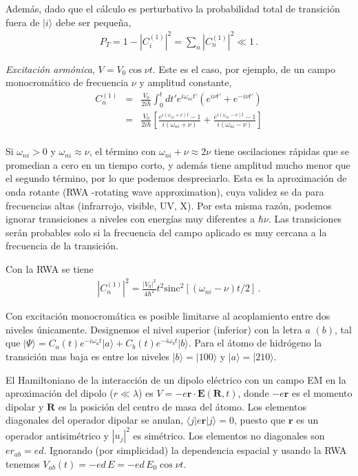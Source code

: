 \documentclass[twocolumn,aps,eqsecnum]{revtex4}
\newcommand{\mbr}{\mathbf{r}}
\newcommand{\mbE}{\mathbf{E}}
\newcommand{\mbR}{\mathbf{R}}
\providecommand{\bra}[1]{\langle #1 \rvert}
\providecommand{\ket}[1]{\lvert #1 \rangle}
\begin{document}
Adem\'as, dado que el c\'alculo es perturbativo la probabilidad total de 
transici\'on fuera de $\ket{i}$ debe ser peque\~na,  
%
\begin{eqnarray} 
 P_T = 1 -  |C_i^{(1)}|^2 = \sum_n  |C_n^{(1)}|^2 \ll 1 \,.
\end{eqnarray}

\vspace{3mm}
\textit{Excitaci\'on arm\'onica}, $V= V_0 \cos{\nu t}$. 
\newline Este es el caso, por ejemplo, de un campo monocrom\'atico de 
frecuencia $\nu$ y amplitud constante,  
%
\begin{eqnarray} 
C_n^{(1)} &=& \frac{V_0}{2i \hbar} \int_0^t  dt' e^{i \omega_{ni} t'} 
	\left( e^{i \nu t'} + e^{- i \nu t'} \right) 		\nonumber \\
&=& \frac{V_0}{2i \hbar } 	\left[ 
	\frac{ e^{i (\omega_{ni} +\nu) t} - 1 }{i (\omega_{ni}  +\nu)} 	
	+ \frac{ e^{i (\omega_{ni} -\nu) t} - 1 }{i (\omega_{ni}  -\nu)} \right] \\ 
\end{eqnarray}

Si $\omega_{ni} > 0$ y $\omega_{ni} \approx \nu$, el t\'ermino con 
$\omega_{ni} +\nu \approx 2\nu$ tiene oscilaciones r\'apidas que se promedian 
a cero en un tiempo corto, y adem\'as tiene amplitud mucho menor que el 
segundo t\'ermino, por lo que podemos despreciarlo. Esta es la aproximaci\'on 
de onda rotante (RWA -rotating wave approximation), cuya validez se da para 
frecuencias altas (infrarrojo, visible, UV, X). Por esta misma raz\'on, podemos 
ignorar transiciones a niveles con energ\'ias muy diferentes a $\hbar \nu$. Las transiciones ser\'an probables solo si la frecuencia del campo aplicado es muy 
cercana a la frecuencia de la transici\'on. 

Con la RWA se tiene 
%
\begin{eqnarray} 
 |C_n^{(1)}|^2 = \frac{|V_0|^2 }{4\hbar^2} t^2 
	\mathrm{sinc}^2{[(\omega_{ni} -\nu) t/2]} \,.
\end{eqnarray}

Con excitaci\'on monocrom\'atica es posible limitarse al acoplamiento entre  
dos niveles \'unicamente. Designemos el nivel superior (inferior) con la letra 
$a$ $(b)$, tal que $\ket{\Psi} = C_a(t) e^{-i \omega_a t} \ket{a} 
+ C_b(t) e^{-i \omega_b t} \ket{b}$. Para el \'atomo de hidr\'ogeno la 
transici\'on mas baja es entre los niveles $\ket{b} = \ket{100}$ y 
$\ket{a} = \ket{210}$.  

El Hamiltoniano de la interacci\'on de un dipolo el\'ectrico con un campo 
EM en la aproximaci\'on del dipolo ($r \ll \lambda$) es 
$V = -e \mbr \cdot \mbE (\mbR,t)$, donde $-e \mbr$ es el momento dipolar 
y $\mbR$ es la posici\'on del centro de masa del \'atomo. 
Los elementos diagonales del operador dipolar se anulan, 
$\bra{j} e \mbr \ket{j} = 0$, puesto que $\mbr$ es un operador 
antisim\'etrico y $| u_j |^2$ es sim\'etrico. Los elementos no diagonales 
son $e r_{ab} = ed$. Ignorando (por simplicidad) la dependencia 
espacial  y usando la RWA tenemos 
$V_{ab} (t) = -ed \,E = -ed \,E_0 \cos{\nu t}$. 
\end{document}
